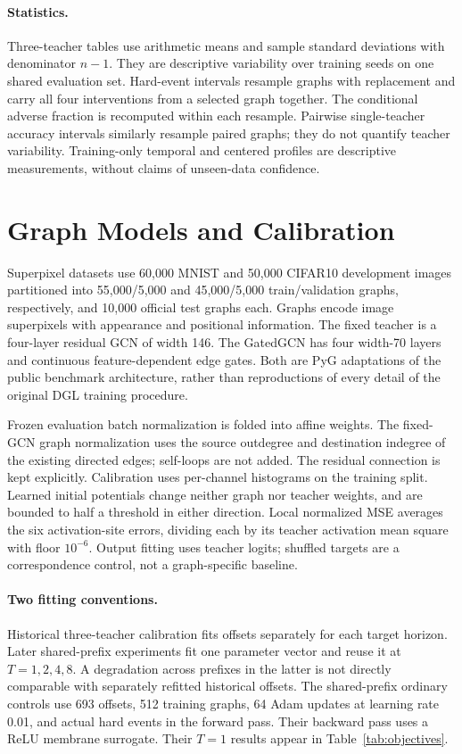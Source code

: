 \documentclass[10pt,twocolumn,letterpaper]{article}
\begin{document}
\paragraph{Statistics.} Three-teacher tables use arithmetic means and sample standard deviations with denominator $n-1$. They are descriptive variability over training seeds on one shared evaluation set. Hard-event intervals resample graphs with replacement and carry all four interventions from a selected graph together. The conditional adverse fraction is recomputed within each resample. Pairwise single-teacher accuracy intervals similarly resample paired graphs; they do not quantify teacher variability. Training-only temporal and centered profiles are descriptive measurements, without claims of unseen-data confidence.

\section{Graph Models and Calibration}
Superpixel datasets use 60,000 MNIST and 50,000 CIFAR10 development images partitioned into 55,000/5,000 and 45,000/5,000 train/validation graphs, respectively, and 10,000 official test graphs each. Graphs encode image superpixels with appearance and positional information. The fixed teacher is a four-layer residual GCN of width 146. The GatedGCN has four width-70 layers and continuous feature-dependent edge gates. Both are PyG adaptations of the public benchmark architecture, rather than reproductions of every detail of the original DGL training procedure.

Frozen evaluation batch normalization is folded into affine weights. The fixed-GCN graph normalization uses the source outdegree and destination indegree of the existing directed edges; self-loops are not added. The residual connection is kept explicitly. Calibration uses per-channel histograms on the training split. Learned initial potentials change neither graph nor teacher weights, and are bounded to half a threshold in either direction. Local normalized MSE averages the six activation-site errors, dividing each by its teacher activation mean square with floor $10^{-6}$. Output fitting uses teacher logits; shuffled targets are a correspondence control, not a graph-specific baseline.

\paragraph{Two fitting conventions.} Historical three-teacher calibration fits offsets separately for each target horizon. Later shared-prefix experiments fit one parameter vector and reuse it at $T=1,2,4,8$. A degradation across prefixes in the latter is not directly comparable with separately refitted historical offsets. The shared-prefix ordinary controls use 693 offsets, 512 training graphs, 64 Adam updates at learning rate 0.01, and actual hard events in the forward pass. Their backward pass uses a ReLU membrane surrogate. Their $T=1$ results appear in Table~\ref{tab:objectives}.
\end{document}
